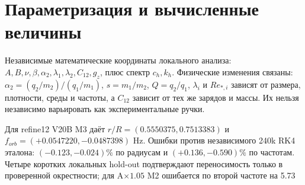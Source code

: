 \documentclass[11pt]{article}
\begin{document}
\section{Параметризация и вычисленные величины}
Независимые математические координаты локального анализа: $A,B,\nu,\beta,\alpha_2,\lambda_1,\lambda_2,C_{12},g_z$, плюс спектр $c_h,k_h$. Физические изменения связаны: $\alpha_2=(q_2/m_2)/(q_1/m_1)$, $s=m_1/m_2$, $Q=q_2/q_1$, $\lambda_i$ и $Re_{*,i}$ зависят от размера, плотности, среды и частоты, а $C_{12}$ зависит от тех же зарядов и массы. Их нельзя независимо варьировать как экспериментальные ручки.

Для refine12 V20B M3 даёт $r/R=(0.5550375,0.7513383)$ и $f_{orb}=(+0.0547220,-0.0487398)$ Hz. Ошибки против независимого 240k RK4 эталона: $(-0.123,-0.024)\%$ по радиусам и $(+0.136,-0.590)\%$ по частотам. Четыре коротких локальных hold-out подтверждают переносимость только в проверенной окрестности; для A$\times1.05$ M2 ошибается по второй частоте на 5.73%
\end{document}
